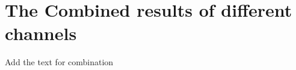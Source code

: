 \section{The Combined results of different channels }
\label{sec:Combination}
Add the text for combination



